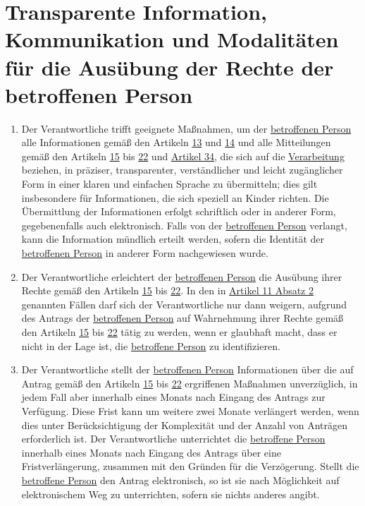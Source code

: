 \chapter{Transparente Information, Kommunikation und Modalitäten für die Ausübung der Rechte der betroffenen Person}
\label{ch:12}


\begin{enumerate}

  \item Der Verantwortliche trifft geeignete Maßnahmen, um der \hyperref[itm:04-1]{betroffenen Person} alle Informationen gemäß den Artikeln
   \hyperref[ch:13]{13} und \hyperref[ch:14]{14} und alle Mitteilungen gemäß den Artikeln \hyperref[ch:15]{15} bis
   \hyperref[ch:22]{22} und \hyperref[ch:34]{Artikel 34}, die sich auf die \hyperref[itm:04-2]{Verarbeitung} beziehen, in präziser,
    transparenter, verständlicher und leicht zugänglicher Form in einer klaren und einfachen Sprache zu übermitteln;
    dies gilt insbesondere für Informationen, die sich speziell an Kinder richten. Die Übermittlung der Informationen
    erfolgt schriftlich oder in anderer Form, gegebenenfalls auch elektronisch. Falls von der \hyperref[itm:04-1]{betroffenen Person}
    verlangt, kann die Information mündlich erteilt werden, sofern die Identität der \hyperref[itm:04-1]{betroffenen Person} in anderer Form
    nachgewiesen wurde.
  \label{itm:12-1}

  \item Der Verantwortliche erleichtert der \hyperref[itm:04-1]{betroffenen Person} die Ausübung ihrer Rechte gemäß den Artikeln \hyperref
   [ch:15]{15} bis \hyperref[ch:22]{22}. In den in \hyperref[itm:11-2]{Artikel 11 Absatz 2} genannten Fällen darf sich
   der Verantwortliche nur dann weigern, aufgrund des Antrags der \hyperref[itm:04-1]{betroffenen Person} auf Wahrnehmung ihrer Rechte gemäß
   den Artikeln \hyperref[ch:15]{15} bis \hyperref[ch:22]{22} tätig zu werden, wenn er glaubhaft macht, dass er nicht
   in der Lage ist, die \hyperref[itm:04-1]{betroffene Person} zu identifizieren.
  \label{itm:12-2}

  \item Der Verantwortliche stellt der \hyperref[itm:04-1]{betroffenen Person} Informationen über die auf Antrag gemäß den Artikeln \hyperref
   [ch:15]{15} bis \hyperref[ch:22]{22} ergriffenen Maßnahmen unverzüglich, in jedem Fall aber innerhalb eines Monats
   nach Eingang des Antrags zur Verfügung. Diese Frist kann um weitere zwei Monate verlängert werden, wenn dies unter
   Berücksichtigung der Komplexität und der Anzahl von Anträgen erforderlich ist. Der Verantwortliche unterrichtet die
   \hyperref[itm:04-1]{betroffene Person} innerhalb eines Monats nach Eingang des Antrags über eine Fristverlängerung, zusammen mit den
   Gründen für die Verzögerung. Stellt die \hyperref[itm:04-1]{betroffene Person} den Antrag elektronisch, so ist sie nach Möglichkeit auf
   elektronischem Weg zu unterrichten, sofern sie nichts anderes angibt.
  \label{itm:12-3}


\end{enumerate}
